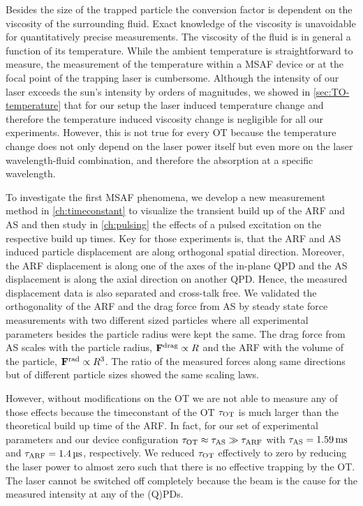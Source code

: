 Besides the size of the trapped particle the conversion factor is dependent on 
the viscosity of the surrounding fluid. Exact knowledge of the viscosity is 
unavoidable for quantitatively precise measurements. The viscosity of the fluid 
is in general a function of its temperature. While the ambient temperature is 
straightforward to measure, the measurement of the temperature within a MSAF 
device or at the focal point of the trapping laser is cumbersome. Although the 
intensity of our laser exceeds the sun's intensity by orders of magnitudes, we 
showed in \cref{sec:TO-temperature} that for our setup the laser induced 
temperature change and therefore the temperature induced viscosity change is 
negligible for all our experiments. However, this is not true for every OT 
because the temperature change does not only depend on the laser power itself 
but even more on the laser wavelength-fluid combination, and therefore the 
absorption at a specific wavelength.

To investigate the first MSAF phenomena, we develop a new measurement method in 
\cref{ch:timeconstant} to visualize the transient build up of the ARF and AS 
and then study in \cref{ch:pulsing} the effects of a pulsed excitation on the 
respective build up times. Key for those experiments is, that the ARF and AS 
induced particle displacement are along orthogonal spatial direction. Moreover, 
the ARF displacement is along one of the axes of the in-plane QPD and the AS 
displacement is along the axial direction on another QPD. Hence, the measured 
displacement data is also separated and cross-talk free. We validated the 
orthogonality of the ARF and the drag force from AS by steady state force 
measurements with two different sized particles where all experimental 
parameters besides the particle radius were kept the same. The drag force from 
AS scales with the particle radius, $\vb{F}^{\mathrm{drag}}\propto R$ and the ARF with the volume 
of the particle, $\vb{F}^{\mathrm{rad}}\propto R^{3}$. The ratio of the measured forces along 
same directions but of different particle sizes showed the same scaling laws. 

However, without modifications on the OT we are not able to measure any of 
those effects because the timeconstant of the OT $\tau_{\mathrm{OT}}$ is much larger than the 
theoretical build up time of the ARF. In fact, for our set of experimental 
parameters and our device configuration $\tau_{\mathrm{OT}} \approx \tau_{\mathrm{AS}} \gg \tau_{\mathrm{ARF}}$ with 
$\tas = \SI{1.59}{\ms}$ and $\tarf = \SI{1.4}{\us}$, respectively. We reduced 
$\tau_{\mathrm{OT}}$ effectively to zero by reducing the laser power to almost zero such that 
there is no effective trapping by the OT. The laser cannot be switched off 
completely because the beam is the cause for the measured intensity at any of 
the (Q)PDs.

